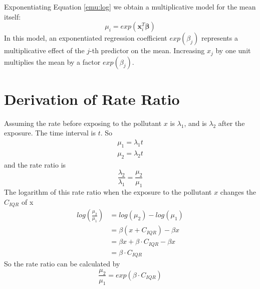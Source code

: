 \documentclass{article}
\begin{document}
Exponentiating Equation \ref{emu:log} we obtain a multiplicative model for the mean itself:
\begin{equation}
    \mu_i=exp(\mathbf{x}^T_i\bm{\beta})
\end{equation}
In this model, an exponentiated regression coefficient $exp(\beta_j)$ represents a multiplicative effect of the $j$-th predictor on the mean. Increasing $x_j$ by one unit multiplies the mean by a factor $exp(\beta_j)$.

\section{Derivation of Rate Ratio}
Assuming the rate before exposing to the pollutant $x$ is $\lambda_1$, and is $\lambda_2$ after the exposure. The time interval is $t$. So
\begin{equation}
       \begin{split}
        \mu_1=\lambda_1 t \\
        \mu_2=\lambda_2 t
    \end{split}
\end{equation}
and the rate ratio is
\begin{equation}
    \frac{\lambda_2}{\lambda_1} = \frac{\mu_2}{\mu_1}
\end{equation}
The logarithm of this rate ratio when the exposure to the pollutant $x$ changes the $C_{IQR}$ of x
\begin{equation}
    \begin{split}
        log(\frac{\mu_2}{\mu_1}) &= log(\mu_2) - log(\mu_1) \\
        &= \beta (x + C_{IQR}) - \beta x \\
        &= \beta x + \beta\cdot C_{IQR} - \beta x \\
        &= \beta\cdot C_{IQR}
    \end{split}
\end{equation}
So the rate ratio can be calculated by
\begin{equation}
    \frac{\mu_2}{\mu_1} = exp(\beta\cdot C_{IQR})
\end{equation}
 
\end{document}
